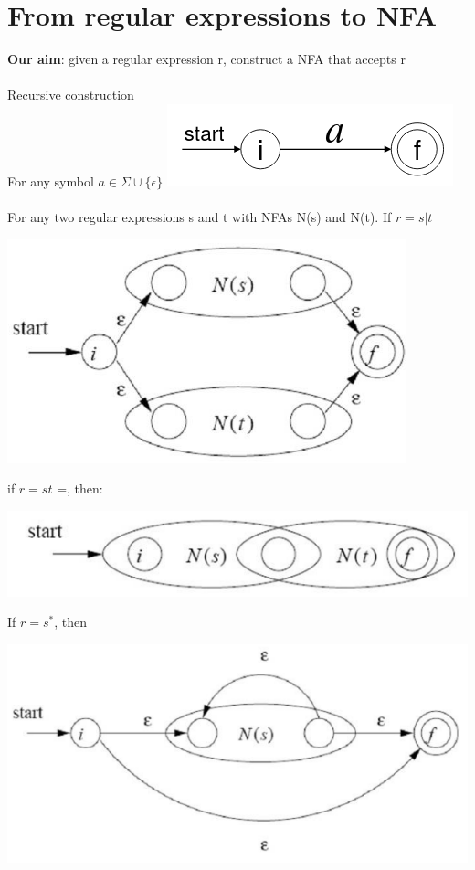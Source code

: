\documentclass{article}[18pt]
\begin{document}
\section{From regular expressions to NFA}
\textbf{Our aim}: given a regular expression r, construct a NFA that accepts r\\
\\
Recursive construction\\
For any symbol $a\in \Sigma \cup \{\epsilon\}$ 
\includegraphics[scale=0.6]{recusrive}\\
\\
For any two regular expressions s and t with NFAs N(s) and N(t).
\newpage
If $r=s|t$
\begin{center}
	\includegraphics[scale=0.7]{"Two Regular Expressions"}
\end{center}
if $r=st$ =, then:
\begin{center}
	\includegraphics[scale=0.7]{r=st}
\end{center}
If $r=s^*$, then
\begin{center}
	\includegraphics[scale=0.7]{r=s*}
\end{center}
\end{document}
